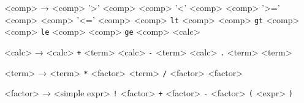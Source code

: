 <comp>           → <comp> '>' <comp>
                 \alt <comp> '<' <comp>
                 \alt <comp> '>=' <comp>
                 \alt <comp> '<=' <comp>
                 \alt <comp> \texttt{lt} <comp>
                 \alt <comp> \texttt{gt} <comp>
                 \alt <comp> \texttt{le} <comp>
                 \alt <comp> \texttt{ge} <comp>
                 \alt <calc>

<calc>           → <calc> \texttt{+} <term>
                 \alt <calc> \texttt{-} <term>
                 \alt <calc> \texttt{.} <term>
                 \alt <term>
                 

<term>           → <term> \texttt{*} <factor>
                 \alt <term> \texttt{/} <factor>
                 \alt <factor>

<factor>         → <simple expr>
                 \alt \texttt{!} <factor>
                 \alt \texttt{+} <factor>
                 \alt \texttt{-} <factor>
                 \alt \texttt{(} <expr> \texttt{)}
